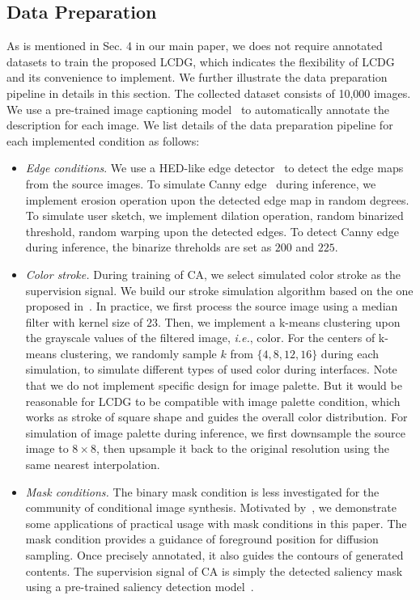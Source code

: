 \documentclass{article}
\begin{document}
\subsection{Data Preparation}
\label{subsection:data preparation}
As is mentioned in Sec. 4 in our main paper, we does not require annotated datasets to train the proposed LCDG, which indicates the flexibility of LCDG and its convenience to implement. We further illustrate the data preparation pipeline in details in this section. The collected dataset consists of 10,000 images. We use a pre-trained image captioning model~\cite{hu2022expansionnet} to automatically annotate the description for each image. We list details of the data preparation pipeline for each implemented condition as follows:
\begin{itemize}
\item \textit{Edge conditions}. We use a HED-like edge detector~\cite{he2020bdcn} to detect the edge maps from the source images. To simulate Canny edge~\cite{canny1986computational} during inference, we implement erosion operation upon the detected edge map in random degrees. To simulate user sketch, we implement dilation operation, random binarized threshold, random warping upon the detected edges. To detect Canny edge during inference, the binarize threholds are set as $200$ and $225$.
  \item \textit{Color stroke.} During training of CA, we select simulated color stroke as the supervision signal. We build our stroke simulation algorithm based on the one proposed in~\cite{meng2021sdedit}. In practice, we first process the source image using a median filter with kernel size of $23$. Then, we implement a k-means clustering upon the grayscale values of the filtered image, \textit{i.e.}, color. For the centers of k-means clustering, we randomly sample $k$ from $\{4, 8, 12, 16\}$ during each simulation, to simulate different types of used color during interfaces. Note that we do not implement specific design for image palette. But it would be reasonable for LCDG to be compatible with image palette condition, which works as stroke of square shape and guides the overall color distribution. For simulation of image palette during inference, we first downsample the source image to $8 \times 8$, then upsample it back to the original resolution using the same nearest interpolation.
  \item \textit{Mask conditions.} The binary mask condition is less investigated for the community of conditional image synthesis. Motivated by~\cite{huang2023composer}, we demonstrate some applications of practical usage with mask conditions in this paper. The mask condition provides a guidance of foreground position for diffusion sampling. Once precisely annotated, it also guides the contours of generated contents. The supervision signal of CA is simply the detected saliency mask using a pre-trained saliency detection model~\cite{qin2020u2}.
\end{itemize}
\end{document}
